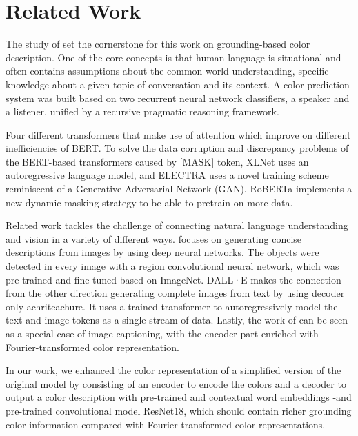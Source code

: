 \section{Related Work}

The study of \citep{monroe-2017-colors} set the cornerstone for this work on grounding-based color description. One of the core concepts is that human language is situational and often contains assumptions about the common world understanding, specific knowledge about a given topic of conversation and its context. A color prediction system was built based on two recurrent neural network classifiers, a speaker and a listener, unified by a recursive pragmatic reasoning framework.

\par
Four different transformers that make use of attention which improve on different inefficiencies of BERT. To solve the data corruption and discrepancy problems of the BERT-based transformers caused by [MASK] token, XLNet uses an autoregressive language model, and ELECTRA uses a novel training scheme reminiscent of a Generative Adversarial Network (GAN). RoBERTa implements a new dynamic masking strategy to be able to pretrain on more data.

\par
Related work tackles the challenge of connecting natural language understanding and vision in a variety of different ways. \citep{karpathy-2014-image_descriptions} focuses on generating concise descriptions from images by using deep neural networks. The objects were detected in every image with a region convolutional neural network, which was  pre-trained and fine-tuned based on ImageNet. DALL·E makes the connection from the other direction generating complete images from text by using decoder only achriteachure. It uses a trained transformer to autoregressively model the text and image tokens as a single stream of data. Lastly, the work of \citep{monroe-2017-colors} can be seen as a special case of image captioning, with the encoder part enriched with Fourier-transformed color representation.

\par
In our work, we enhanced the color representation of a simplified version of the original model by \citep{monroe-2017-colors} consisting of an encoder to encode the colors and a decoder to output a color description with pre-trained and contextual word embeddings -and pre-trained convolutional model ResNet18, which should contain richer grounding color information compared with Fourier-transformed color representations.

